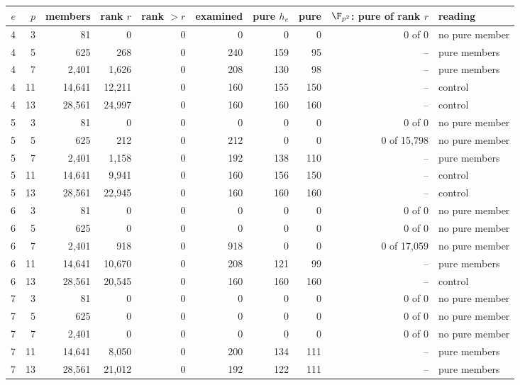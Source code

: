 \begin{tabular}{@{}rrrrrrrrrl@{}}
\toprule
$e$ & $p$ & members & rank $r$ & rank $>r$ & examined & pure $h_e$ & pure & $\F_{p^2}$: pure of rank $r$ & reading\\
\midrule
4 & 3 & 81 & 0 & 0 & 0 & 0 & 0 & 0 of 0 & no pure member\\
4 & 5 & 625 & 268 & 0 & 240 & 159 & 95 & -- & pure members\\
4 & 7 & 2{,}401 & 1{,}626 & 0 & 208 & 130 & 98 & -- & pure members\\
4 & 11 & 14{,}641 & 12{,}211 & 0 & 160 & 155 & 150 & -- & control\\
4 & 13 & 28{,}561 & 24{,}997 & 0 & 160 & 160 & 160 & -- & control\\
5 & 3 & 81 & 0 & 0 & 0 & 0 & 0 & 0 of 0 & no pure member\\
5 & 5 & 625 & 212 & 0 & 212 & 0 & 0 & 0 of 15{,}798 & no pure member\\
5 & 7 & 2{,}401 & 1{,}158 & 0 & 192 & 138 & 110 & -- & pure members\\
5 & 11 & 14{,}641 & 9{,}941 & 0 & 160 & 156 & 150 & -- & control\\
5 & 13 & 28{,}561 & 22{,}945 & 0 & 160 & 160 & 160 & -- & control\\
6 & 3 & 81 & 0 & 0 & 0 & 0 & 0 & 0 of 0 & no pure member\\
6 & 5 & 625 & 0 & 0 & 0 & 0 & 0 & 0 of 0 & no pure member\\
6 & 7 & 2{,}401 & 918 & 0 & 918 & 0 & 0 & 0 of 17{,}059 & no pure member\\
6 & 11 & 14{,}641 & 10{,}670 & 0 & 208 & 121 & 99 & -- & pure members\\
6 & 13 & 28{,}561 & 20{,}545 & 0 & 160 & 160 & 160 & -- & control\\
7 & 3 & 81 & 0 & 0 & 0 & 0 & 0 & 0 of 0 & no pure member\\
7 & 5 & 625 & 0 & 0 & 0 & 0 & 0 & 0 of 0 & no pure member\\
7 & 7 & 2{,}401 & 0 & 0 & 0 & 0 & 0 & 0 of 0 & no pure member\\
7 & 11 & 14{,}641 & 8{,}050 & 0 & 200 & 134 & 111 & -- & pure members\\
7 & 13 & 28{,}561 & 21{,}012 & 0 & 192 & 122 & 111 & -- & pure members\\
\bottomrule
\end{tabular}
